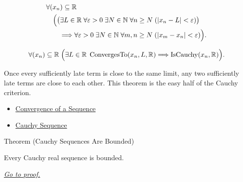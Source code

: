 \begin{remark*}
\[
\begin{aligned}
&\forall (x_n)\subseteq\mathbb{R}\\
&\quad
\Bigl(
  \bigl(\exists L\in\mathbb{R}\;\forall \varepsilon>0\;\exists N\in\mathbb{N}
  \;\forall n\ge N\;( |x_n-L|<\varepsilon )\bigr)\\
&\qquad\Longrightarrow
  \forall \varepsilon>0\;\exists N\in\mathbb{N}\;\forall m,n\ge N
  \;( |x_m-x_n|<\varepsilon )
\Bigr).
\end{aligned}
\]
\end{remark*}

\begin{remark*}
\[
\forall (x_n)\subseteq\mathbb{R}\;
\Bigl(
  \exists L\in\mathbb{R}\;\operatorname{ConvergesTo}(x_n,L,\mathbb{R})
  \Longrightarrow
  \operatorname{IsCauchy}(x_n,\mathbb{R})
\Bigr).
\]
\end{remark*}

\begin{remark*}[Interpretation]
Once every sufficiently late term is close to the same limit, any two
sufficiently late terms are close to each other. This theorem is the easy
half of the Cauchy criterion.
\end{remark*}

\begin{dependencies}
\begin{itemize}
  \item \hyperref[def:convergent-sequence]{Convergence of a Sequence}
  \item \hyperref[def:cauchy-sequence]{Cauchy Sequence}
\end{itemize}
\end{dependencies}


\begin{theorembox}{Theorem (Cauchy Sequences Are Bounded)}
\begin{theorem}
\label{thm:cauchy-sequences-are-bounded}
Every Cauchy real sequence is bounded.

\smallskip
\noindent
\hyperref[prf:cauchy-sequences-are-bounded]{\textit{Go to proof.}}
\end{theorem}
\end{theorembox}

